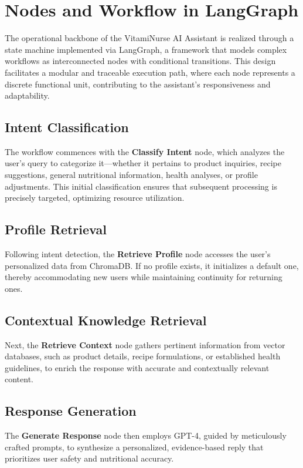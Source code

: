 \section{Nodes and Workflow in LangGraph}
The operational backbone of the VitamiNurse AI Assistant is realized through a state machine implemented via LangGraph, a framework that models complex workflows as interconnected nodes with conditional transitions. This design facilitates a modular and traceable execution path, where each node represents a discrete functional unit, contributing to the assistant's responsiveness and adaptability.

\subsection{Intent Classification}
The workflow commences with the \textbf{Classify Intent} node, which analyzes the user's query to categorize it—whether it pertains to product inquiries, recipe suggestions, general nutritional information, health analyses, or profile adjustments. This initial classification ensures that subsequent processing is precisely targeted, optimizing resource utilization.

\subsection{Profile Retrieval}
Following intent detection, the \textbf{Retrieve Profile} node accesses the user's personalized data from ChromaDB. If no profile exists, it initializes a default one, thereby accommodating new users while maintaining continuity for returning ones.

\subsection{Contextual Knowledge Retrieval}
Next, the \textbf{Retrieve Context} node gathers pertinent information from vector databases, such as product details, recipe formulations, or established health guidelines, to enrich the response with accurate and contextually relevant content.

\subsection{Response Generation}
The \textbf{Generate Response} node then employs GPT-4, guided by meticulously crafted prompts, to synthesize a personalized, evidence-based reply that prioritizes user safety and nutritional accuracy.


